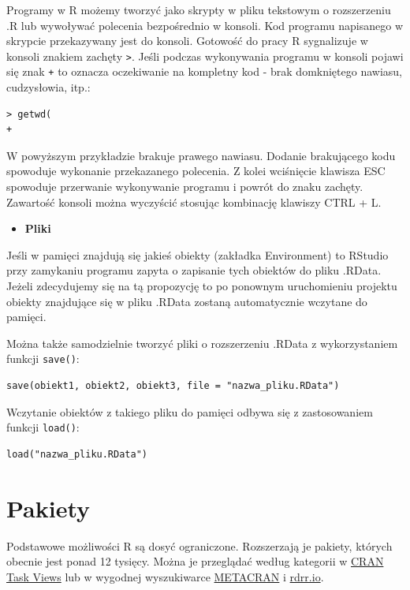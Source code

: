 \documentclass[]{book}
\providecommand{\tightlist}{%
  \setlength{\itemsep}{0pt}\setlength{\parskip}{0pt}}
\begin{document}
Programy w R możemy tworzyć jako skrypty w pliku tekstowym o
rozszerzeniu .R lub wywoływać polecenia bezpośrednio w konsoli. Kod
programu napisanego w skrypcie przekazywany jest do konsoli. Gotowość do
pracy R sygnalizuje w konsoli znakiem zachęty \texttt{\textgreater{}}.
Jeśli podczas wykonywania programu w konsoli pojawi się znak \texttt{+}
to oznacza oczekiwanie na kompletny kod - brak domkniętego nawiasu,
cudzysłowia, itp.:

\begin{verbatim}
> getwd(
+ 
\end{verbatim}

W powyższym przykładzie brakuje prawego nawiasu. Dodanie brakującego
kodu spowoduje wykonanie przekazanego polecenia. Z kolei wciśnięcie
klawisza ESC spowoduje przerwanie wykonywanie programu i powrót do znaku
zachęty. Zawartość konsoli można wyczyścić stosując kombinację klawiszy
CTRL + L.

\begin{itemize}
\tightlist
\item
  \textbf{Pliki }
\end{itemize}

Jeśli w pamięci znajdują się jakieś obiekty (zakładka Environment) to
RStudio przy zamykaniu programu zapyta o zapisanie tych obiektów do
pliku .RData. Jeżeli zdecydujemy się na tą propozycję to po ponownym
uruchomieniu projektu obiekty znajdujące się w pliku .RData zostaną
automatycznie wczytane do pamięci.

Można także samodzielnie tworzyć pliki o rozszerzeniu .RData z
wykorzystaniem funkcji \texttt{save()}:

\begin{verbatim}
save(obiekt1, obiekt2, obiekt3, file = "nazwa_pliku.RData")
\end{verbatim}

Wczytanie obiektów z takiego pliku do pamięci odbywa się z zastosowaniem
funkcji \texttt{load()}:

\begin{verbatim}
load("nazwa_pliku.RData")
\end{verbatim}

\section{Pakiety}\label{pakiety}

Podstawowe możliwości R są dosyć ograniczone. Rozszerzają je pakiety,
których obecnie jest ponad 12 tysięcy. Można je przeglądać według
kategorii w \href{https://cran.r-project.org/web/views/}{CRAN Task
Views} lub w wygodnej wyszukiwarce
\href{https://www.r-pkg.org/}{METACRAN} i
\href{https://rdrr.io/}{rdrr.io}.
\end{document}
